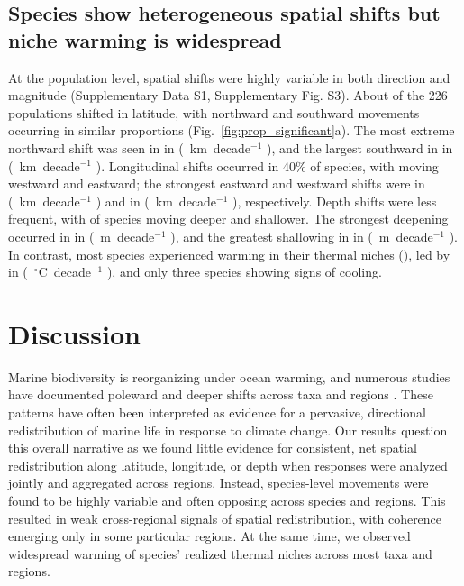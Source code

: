 \documentclass[9pt,twocolumn,twoside]{pnas-new}
\begin{document}
\subsection*{Species show heterogeneous spatial shifts but niche warming is widespread}





At the population level, spatial shifts were highly variable in both direction and magnitude (Supplementary Data S1, Supplementary Fig. S3). About \LatPerc{} of the 226 populations shifted in latitude, with northward and southward movements occurring in similar proportions (Fig.~\ref{fig:prop_significant}a). The most extreme northward shift was seen in \MaxLatSpecies{} in \MaxLatRegion{} (\MaxLatMedian{}~km~decade$^{-1}$ \MaxLatCI{}), and the largest southward in \MinLatSpecies{} in \MinLatRegion{} (\MinLatMedian{}~km~decade$^{-1}$ \MinLatCI{}). Longitudinal shifts occurred in 40\% of species, with \LonWestingPerc{} moving westward and \LonEastingPerc{} eastward; the strongest eastward and westward shifts were \MaxLonSpecies{} in \MaxLonRegion{} (\MaxLonMedian{}~km~decade$^{-1}$ \MaxLonCI{}) and \MinLonSpecies{} in \MinLonRegion{} (\MinLonMedian{}~km~decade$^{-1}$ \MinLonCI{}), respectively. Depth shifts were less frequent, with \DepthDeepeningPerc{} of species moving deeper and \DepthShallowingPerc{} shallower. The strongest deepening occurred in \MaxDepthSpecies{} in \MaxDepthRegion{} (\MaxDepthMedian{}~m~decade$^{-1}$ \MaxDepthCI{}), and the greatest shallowing in \MinDepthSpecies{} in \MinDepthRegion{} (\MinDepthMedian{}~m~decade$^{-1}$  \MinDepthCI{}). 
In contrast, most species experienced warming in their thermal niches (\ThermalPerc{}), led by \MaxThermalSpecies{} in \MaxThermalRegion{} (\MaxThermalMedian{}~$^\circ$C~decade$^{-1}$ \MaxThermalCI{}), and only three species showing signs of cooling.

\section*{Discussion}

Marine biodiversity is reorganizing under ocean warming, and numerous studies have documented poleward and deeper shifts across taxa and regions \citep{poloczanska_global_2013,dulvy_climate_2008,poloczanska_responses_2016, perry_climate_2005}. These patterns have often been interpreted as evidence for a pervasive, directional redistribution of marine life in response to climate change. Our results question this overall narrative as we found little evidence for consistent, net spatial redistribution along latitude, longitude, or depth when responses were analyzed jointly and aggregated across regions. Instead, species-level movements were found to be highly variable and often opposing across species and regions. This resulted in weak cross-regional signals of spatial redistribution, with coherence emerging only in some particular regions. At the same time, we observed widespread warming of species’ realized thermal niches across most taxa and regions.
\end{document}
